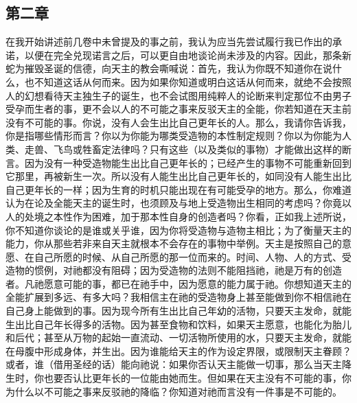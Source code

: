 
\subsection{第二章}

\par

在我开始讲述前几卷中未曾提及的事之前，我认为应当先尝试履行我已作出的承诺，以便在完全兑现诺言之后，可以更自由地谈论尚未涉及的内容。因此，那条新蛇为摧毁圣诞的信德，向天主的教会嘶喊说：首先，我认为你既不知道你在说什么，也不知道这话从何而来。因为如果你知道或明白这话从何而来，就绝不会按照人的幻想看待天主独生子的诞生，也不会试图用纯粹人的论断来判定那位不由男子受孕而生者的事，更不会以人的不可能之事来反驳天主的全能，你若知道在天主前没有不可能的事。你说，没有人会生出比自己更年长的人。那么，我请你告诉我，你是指哪些情形而言？你以为你能为哪类受造物的本性制定规则？你以为你能为人类、走兽、飞鸟或牲畜定法律吗？只有这些（以及类似的事物）才能做出这样的断言。因为没有一种受造物能生出比自己更年长的；已经产生的事物不可能重新回到它那里，再被新生一次。所以没有人能生出比自己更年长的，如同没有人能生出比自己更年长的一样；因为生育的时机只能出现在有可能受孕的地方。那么，你难道认为在论及全能天主的诞生时，也须顾及与地上受造物出生相同的考虑吗？你竟以人的处境之本性作为困难，加于那本性自身的创造者吗？你看，正如我上述所说，你不知道你谈论的是谁或关乎谁，因为你将受造物与造物主相比；为了衡量天主的能力，你从那些若非来自天主就根本不会存在的事物中举例。天主是按照自己的意愿、在自己所愿的时候、从自己所愿的那一位而来的。时间、人物、人的方式、受造物的惯例，对祂都没有阻碍；因为受造物的法则不能阻挡祂，祂是万有的创造者。凡祂愿意可能的事，都已在祂手中，因为愿意的能力属于祂。你想知道天主的全能扩展到多远、有多大吗？我相信主在祂的受造物身上甚至能做到你不相信祂在自己身上能做到的事。因为现今所有生出比自己年幼的活物，只要天主发命，就能生出比自己年长得多的活物。因为甚至食物和饮料，如果天主愿意，也能化为胎儿和后代；甚至从万物的起始一直流动、一切活物所使用的水，只要天主发命，就能在母腹中形成身体，并生出。因为谁能给天主的作为设定界限，或限制天主眷顾？或者，谁（借用圣经的话）能向祂说：如果你否认天主能做一切事，那么当天主降生时，你也要否认比更年长的一位能由她而生。但如果在天主没有不可能的事，你为什么以不可能之事来反驳祂的降临？你知道对祂而言没有一件事是不可能的。\par

